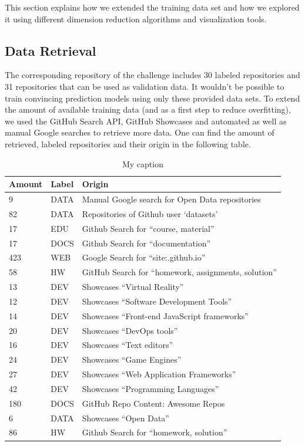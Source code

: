 \documentclass[%
a4paper,
DIV12,
2.5headlines,
bigheadings,
titlepage,
openbib,
]{scrartcl}
\begin{document}
This section explains how we extended the training data set and how we explored it using different dimension reduction algorithms and visualization tools.

\subsection{Data Retrieval}\label{data-retrieval}

The corresponding repository of the challenge includes 30 labeled repositories and 31 repositories that can be used as validation data.
It wouldn't be possible to train convincing prediction models using only these provided data sets.
To extend the amount of available training data (and as a first step to reduce overfitting), we used the GitHub Search API, GitHub Showcases and automated as well as manual Google searches to retrieve more data.
One can find the amount of retrieved, labeled repositories and their origin in the following table.

\begin{table}[]
\centering
\label{data_sources}
\caption{My caption}
\begin{tabular}{|l|l|l|}
\hline
Amount & Label & Origin \\ \hline
9 & DATA & Manual Google search for Open Data
repositories \\ \hline
82 & DATA & Repositories of Github user `datasets' \\ \hline
17 & EDU & Github Search for ``course, material'' \\ \hline
17 & DOCS & Github Search for ``documentation'' \\ \hline
423 & WEB & Google Search for ``site:.github.io'' \\ \hline
58 & HW & GitHub Search for ``homework, assignments,
solution'' \\ \hline
13 & DEV & Showcases ``Virtual Reality'' \\ \hline
12 & DEV & Showcases ``Software Development Tools'' \\ \hline
14 & DEV & Showcases ``Front-end JavaScript frameworks'' \\ \hline
20 & DEV & Showcases ``DevOps tools'' \\ \hline
16 & DEV & Showcases ``Text editors'' \\ \hline
24 & DEV & Showcases ``Game Engines'' \\ \hline
27 & DEV & Showcases ``Web Application Frameworks'' \\ \hline
42 & DEV & Showcases ``Programming Languages'' \\ \hline
180 & DOCS & GitHub Repo Content: Awesome Repos \\ \hline
6 & DATA & Showcases ``Open Data'' \\ \hline
86 & HW & Github Search for ``homework, solution'' \\ \hline
\end{tabular}
\end{table}
\end{document}
